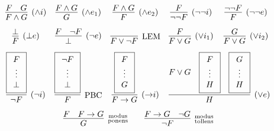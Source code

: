 \begin{table}[hbt]
    \begin{gather*}
    \begin{array}{ccccc}
    \infer[(\land i)]{F\land G}{F & G}
    &
    \infer[(\land e_1)]{G}{F \land G}
    &
    \infer[(\land e_2)]{F}{F \land G}
    &
    \infer[(\lnot\lnot i)]{\lnot\lnot F}{F}
    &
    \infer[(\lnot\lnot e)]{F}{\lnot\lnot F}
    \\[0.7em]
    \infer[(\bot e)]{F}{\bot}
    &
    \infer[(\lnot e)]{\bot}{F & \lnot F}
    &
    \infer[\text{LEM}]{F\lor\lnot F}{}
    &
    \infer[(\lor i_1)]{F\lor G}{F}
    &
    \infer[(\lor i_2)]{F\lor G}{G}
    \\[0.7em]
    \infer[(\lnot i)]{\lnot F}{
        \boxed{\begin{array}{c}F \\ \vdots \\ \bot \end{array}}}
    &
    \infer[\text{PBC}]{F}{
        \boxed{\begin{array}{c}\lnot F \\ \vdots \\ \bot \end{array}}}
    &
    \infer[({\limp} i)]{F\limp G}{
        \boxed{\begin{array}{c}F \\ \vdots \\ G \end{array}
    }}
    &
    \multicolumn{2}{l}{
        \infer[(\lor e)]{H}{
            F\lor G &
            \boxed{\begin{array}{c}F \\ \vdots \\ H \end{array}} &
            \boxed{\begin{array}{c}G \\ \vdots \\ H \end{array}}
        }
    }
    \\[0.7em]
    &
    \multicolumn{3}{r}{
    \infer[\substack{\text{modus}\\\text{ponens}}]{G}{F & F\limp G}
    \qquad
    \infer[\substack{\text{modus}\\\text{tollens}}]{\lnot F}{F\limp G & \lnot G}
    }
    &
    \end{array}
    \end{gather*}
    \caption{Natural Deduction Rules for Connectives}\label{tab:natural:deduction:connectives}
    \end{table}
